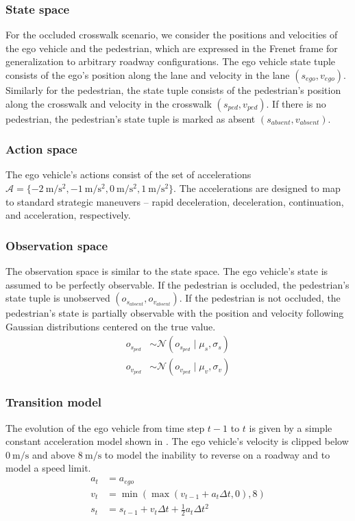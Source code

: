 \documentclass[conference]{IEEEtran}
\begin{document}
\subsubsection{State space} For the occluded crosswalk scenario, we consider the positions and velocities of the ego vehicle and the pedestrian, which are expressed in the Frenet frame for generalization to arbitrary roadway configurations. The ego vehicle state tuple consists of the ego's position along the lane and velocity in the lane $(s_{ego}, v_{ego})$. Similarly for the pedestrian, the state tuple consists of the pedestrian's position along the crosswalk and velocity in the crosswalk $(s_{ped}, v_{ped})$. If there is no pedestrian, the pedestrian's state tuple is marked as absent $(s_{absent}, v_{absent})$.

\subsubsection{Action space} The ego vehicle's actions consist of the set of accelerations $\mathcal{A} = \{-2~\si{\meter\per\square\second}, -1~\si{\meter\per\square\second}, 0~\si{\meter\per\square\second}, 1~\si{\meter\per\square\second}\}$. The accelerations are designed to map to standard strategic maneuvers -- rapid deceleration, deceleration, continuation, and acceleration, respectively.

\subsubsection{Observation space} The observation space is similar to the state space. The ego vehicle's state is assumed to be perfectly observable. If the pedestrian is occluded, the pedestrian's state tuple is unobserved $(o_{s_{absent}}, o_{v_{absent}})$. If the pedestrian is not occluded, the pedestrian's state is partially observable with the position and velocity following Gaussian distributions centered on the true value.
\begin{align}
    o_{s_{ped}} &\sim \mathcal{N}(o_{s_{ped}} \mid \mu_s, \sigma_s) \\
    o_{v_{ped}} &\sim \mathcal{N}(o_{v_{ped}} \mid \mu_v, \sigma_v)
\end{align} 

\subsubsection{Transition model} The evolution of the ego vehicle from time step $t-1$ to $t$ is given by a simple constant acceleration model shown in . The ego vehicle's velocity is clipped below $0~ \si{\meter\per\second}$ and above $8~ \si{\meter\per\second}$ to model the inability to reverse on a roadway and to model a speed limit.
\begin{align}
    a_t &= a_{ego} \nonumber \\
    v_t &= \min(\max(v_{t-1} + a_t \Delta t, 0), 8) \label{eq:ego_transition} \\
    s_t &= s_{t-1} + v_t \Delta t + \tfrac{1}{2} a_t \Delta t^2 \nonumber
\end{align}
\end{document}
